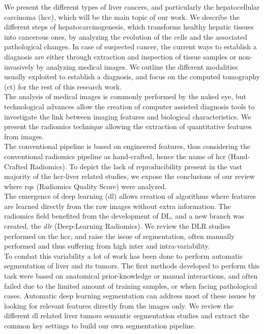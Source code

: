 We present the different types of liver cancers, and particularly the
hepatocellular carcinoma (\ac{hcc}), which will be the main topic of our work. We describe the different steps of hepatocarcinogenesis, which
transforms healthy hepatic tissues into cancerous ones, by analyzing the
evolution of the cells and the associated pathological changes. 
In case of suspected cancer, the current ways to establish a diagnosis 
are either through extraction and inspection of tissue samples or 
non-invasively by analyzing medical images.  We outline the different modalities usually exploited to establish a diagnosis, and focus on the computed tomography (\ac{ct}) for the rest of this
research work. \\
The analysis of medical images is commonly performed by the naked eye,
but technological advances allow the creation of computer assisted
diagnosis tools to investigate the link between imaging features 
and biological characteristics.
We present the radiomics technique allowing the extraction of
quantitative features from images. \\
The conventional pipeline is based on 
engineered features, thus considering the conventional radiomics pipeline as hand-crafted, hence the name of \ac{hcr} (Hand-Crafted Radiomics).
To depict the lack of reproducibility present in the vast majority of
the \ac{hcr}-liver related studies, we expose the conclusions of our review where \ac{rqs} (Radiomics Quality Score) were analyzed. \\
The emergence of deep learning (\ac{dl}) allows creation of algorithms where features are learned directly from the raw images without extra information. The radiomics field benefited from the development of DL, and a new branch was created, the \emph{\ac{dlr}} (Deep-Learning Radiomics). We review the DLR studies performed on the \ac{hcc}, and raise the issue of segmentation, often manually performed and thus suffering from high inter and intra-variability. \\
To combat this variability a lot of work has been done to perform
automatic segmentation of liver and its tumors.
The first methods developed to perform this task were based on
anatomical prior-knowledge or manual interactions, and often failed due to  the limited amount of training samples, or when
facing pathological cases. Automatic deep learning segmentation can address most of these issues by looking for relevant features directly from the images only. We review the different \ac{dl} related liver tumors semantic segmentation studies and extract the common key settings to build our own segmentation pipeline.
